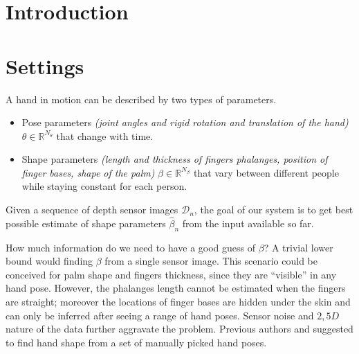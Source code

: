 \section{Introduction}
\section{Settings}
A hand in motion can be described by two types of parameters.
\begin{itemize}
\item Pose parameters \textit{(joint angles and rigid rotation and translation of the hand)} $\theta \in \mathbb{R}^{N_{\theta}}$ that change with time. 
\item Shape parameters \textit{(length and thickness of fingers phalanges, position of finger bases, shape of the palm)} $\beta \in \mathbb{R}^{N_{\beta}}$ that vary between different people while staying constant for each person. 
\end{itemize}
Given a sequence of depth sensor images $\mathcal{D}_n$, the goal of our system is to get best possible estimate of shape parameters $\hat{\beta}_n$ from the input available so far.

How much information do we need to have a good guess of $\beta$? A trivial lower bound would finding $\beta$ from a single sensor image. This scenario could be conceived for palm shape and fingers thickness, since they are ``visible'' in any hand pose. However, the phalanges length cannot be estimated when the fingers are straight; moreover the locations of finger bases are hidden under the skin and can only be inferred after seeing a range of hand poses. Sensor noise and $2,5 D$ nature of the data further aggravate the problem. 
Previous authors \cite{joseph2016fits} and \cite{tkach2016sphere} suggested to find hand shape from a set of manually picked hand poses. 

